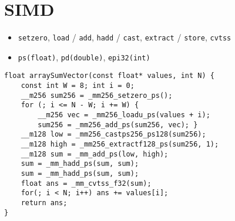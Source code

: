 \section{SIMD}
\begin{itemize}[nosep]
    \item \texttt{setzero}, \texttt{load} / \texttt{add}, \texttt{hadd} / \texttt{cast}, \texttt{extract} / \texttt{store}, \texttt{cvtss}
    \item \texttt{ps(float)}, \texttt{pd(double)}, \texttt{epi32(int)}
\end{itemize}
\begin{verbatim}
float arraySumVector(const float* values, int N) {
    const int W = 8; int i = 0;
    __m256 sum256 = _mm256_setzero_ps(); 
    for (; i <= N - W; i += W) {
        __m256 vec = _mm256_loadu_ps(values + i);
        sum256 = _mm256_add_ps(sum256, vec); }
    __m128 low = _mm256_castps256_ps128(sum256);
    __m128 high = _mm256_extractf128_ps(sum256, 1);
    __m128 sum = _mm_add_ps(low, high);
    sum = _mm_hadd_ps(sum, sum);
    sum = _mm_hadd_ps(sum, sum);
    float ans = _mm_cvtss_f32(sum);
    for(; i < N; i++) ans += values[i];
    return ans;
}
\end{verbatim}